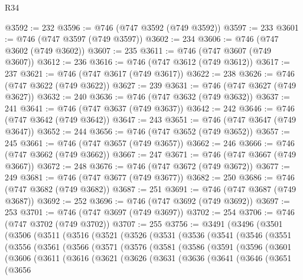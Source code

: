 \begin{lexlean}{R34}
\begin{coremodule}
@3592 := 232
@3596 := @746 (@747 @3592 (@749 @3592))
@3597 := 233
@3601 := @746 (@747 @3597 (@749 @3597))
@3602 := 234
@3606 := @746 (@747 @3602 (@749 @3602))
@3607 := 235
@3611 := @746 (@747 @3607 (@749 @3607))
@3612 := 236
@3616 := @746 (@747 @3612 (@749 @3612))
@3617 := 237
@3621 := @746 (@747 @3617 (@749 @3617))
@3622 := 238
@3626 := @746 (@747 @3622 (@749 @3622))
@3627 := 239
@3631 := @746 (@747 @3627 (@749 @3627))
@3632 := 240
@3636 := @746 (@747 @3632 (@749 @3632))
@3637 := 241
@3641 := @746 (@747 @3637 (@749 @3637))
@3642 := 242
@3646 := @746 (@747 @3642 (@749 @3642))
@3647 := 243
@3651 := @746 (@747 @3647 (@749 @3647))
@3652 := 244
@3656 := @746 (@747 @3652 (@749 @3652))
@3657 := 245
@3661 := @746 (@747 @3657 (@749 @3657))
@3662 := 246
@3666 := @746 (@747 @3662 (@749 @3662))
@3667 := 247
@3671 := @746 (@747 @3667 (@749 @3667))
@3672 := 248
@3676 := @746 (@747 @3672 (@749 @3672))
@3677 := 249
@3681 := @746 (@747 @3677 (@749 @3677))
@3682 := 250
@3686 := @746 (@747 @3682 (@749 @3682))
@3687 := 251
@3691 := @746 (@747 @3687 (@749 @3687))
@3692 := 252
@3696 := @746 (@747 @3692 (@749 @3692))
@3697 := 253
@3701 := @746 (@747 @3697 (@749 @3697))
@3702 := 254
@3706 := @746 (@747 @3702 (@749 @3702))
@3707 := 255
@3756 := @3491
    (@3496
      (@3501
        (@3506
          (@3511
            (@3516
              (@3521
                (@3526
                  (@3531
                    (@3536
                      (@3541
                        (@3546
                          (@3551
                            (@3556
                              (@3561
                                (@3566
                                  (@3571
                                    (@3576
                                      (@3581
                                        (@3586
                                          (@3591
                                            (@3596
                                              (@3601
                                                (@3606
                                                  (@3611
                                                    (@3616
                                                      (@3621
                                                        (@3626
                                                          (@3631
                                                            (@3636
                                                              (@3641
                                                                (@3646
                                                                  (@3651
                                                                    (@3656

\end{coremodule}
\end{lexlean}
